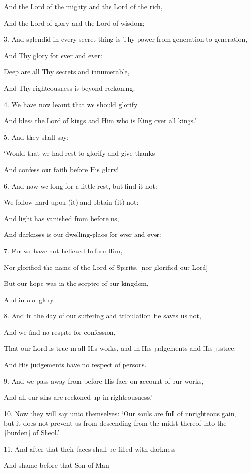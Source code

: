 And the Lord of the mighty and the Lord of the rich,

And the Lord of glory and the Lord of wisdom;

3. And splendid in every secret thing is Thy power from generation to generation,

And Thy glory for ever and ever:

Deep are all Thy secrets and innumerable,

And Thy righteousness is beyond reckoning.

4. We have now learnt that we should glorify

And bless the Lord of kings and Him who is King over all kings.’

5. And they shall say:

‘Would that we had rest to glorify and give thanks

And confess our faith before His glory!

6. And now we long for a little rest, but find it not:

We follow hard upon (it) and obtain (it) not:

And light has vanished from before us,

And darkness is our dwelling-place for ever and ever:

7. For we have not believed before Him,

Nor glorified the name of the Lord of Spirits, [nor glorified our Lord]

But our hope was in the sceptre of our kingdom,

And in our glory.

8. And in the day of our suffering and tribulation He saves us not,

And we find no respite for confession,

That our Lord is true in all His works, and in His judgements and His justice;

And His judgements have no respect of persons.

9. And we pass away from before His face on account of our works,

And all our sins are reckoned up in righteousness.’

10. Now they will say unto themselves: ‘Our souls
are full of unrighteous gain, but it does not prevent
us from descending from the midst thereof into the
†burden† of Sheol.’

11. And after that their faces shall be filled with darkness

And shame before that Son of Man,

